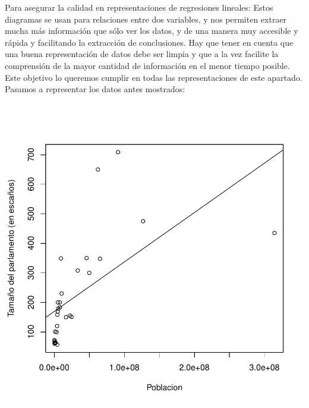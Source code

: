 \documentclass [a4paper] {article}
\begin{document}
Para asegurar la calidad en representaciones de regresiones lineales: Estos diagramas se usan para relaciones entre dos variables, 
y nos permiten extraer mucha más información que sólo ver los datos, y de una manera muy accesible y rápida y facilitando la extracción de 
conclusiones. Hay que tener en cuenta que una buena representación de datos debe ser limpia y que a la vez facilite la comprensión de la 
mayor cantidad de información en el menor tiempo posible. Este objetivo lo queremos cumplir en todas las representaciones de este apartado.
Pasamos a representar los datos antes mostrados:

\begin{center}
\includegraphics{entrega-plot_democracia}
\end{center}
\end{document}
